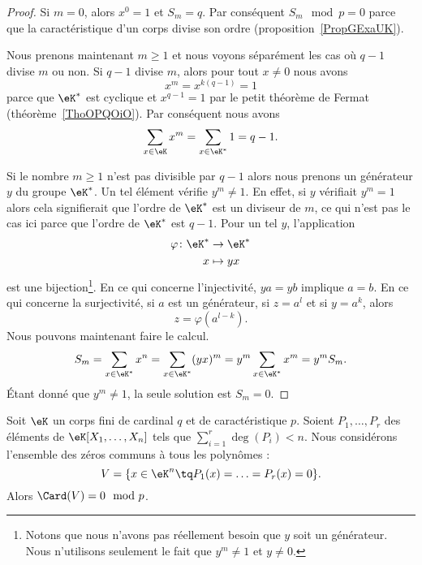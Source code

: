 \begin{proof}
	Si \( m=0\), alors \( x^0=1\) et \( S_m=q\). Par conséquent \( S_m\mod p=0\) parce que la caractéristique d'un corps divise son ordre (proposition~\ref{PropGExaUK}).

	Nous prenons maintenant \( m\geq 1\) et nous voyons séparément les cas où \( q-1\) divise \( m\) ou non. Si \( q-1\) divise \( m\), alors pour tout \( x\neq 0\) nous avons
	\begin{equation}
		x^m=x^{k(q-1)}=1
	\end{equation}
	parce que \( \eK^*\) est cyclique et \( x^{q-1}=1\) par le petit théorème de Fermat (théorème~\ref{ThoOPQOiO}). Par conséquent nous avons
	\begin{equation}
		\sum_{x\in \eK}x^m=\sum_{x\in \eK^*}1=q-1.
	\end{equation}

	Si le nombre \( m\geq 1\) n'est pas divisible par \( q-1\) alors nous prenons un générateur \( y\) du groupe \( \eK^*\). Un tel élément vérifie \( y^m\neq 1\). En effet, si \( y\) vérifiait \( y^m=1\) alors cela signifierait que l'ordre de \( \eK^*\) est un diviseur de \( m\), ce qui n'est pas le cas ici parce que l'ordre de \( \eK^*\) est \( q-1\). Pour un tel \( y\), l'application
	\begin{equation}
		\begin{aligned}
			\varphi\colon \eK^* & \to \eK^*  \\
			x                   & \mapsto yx
		\end{aligned}
	\end{equation}
	est une bijection\footnote{Notons que nous n'avons pas réellement besoin que \( y\) soit un générateur. Nous n'utilisons seulement le fait que \( y^m\neq 1\) et \( y\neq 0\).}. En ce qui concerne l'injectivité, \( ya=yb\) implique \( a=b\). En ce qui concerne la surjectivité, si \( a\) est un générateur, si \( z=a^l\) et si \( y=a^k\), alors
	\begin{equation}
		z=\varphi(a^{l-k}).
	\end{equation}
	Nous pouvons maintenant faire le calcul.
	\begin{equation}
		S_m=\sum_{x\in \eK^*}x^n=\sum_{x\in \eK^*}(yx)^m=y^m\sum_{x\in \eK^*}x^m=y^mS_m.
	\end{equation}
	Étant donné que \( y^m\neq 1\), la seule solution est \( S_m=0\).
\end{proof}

\begin{theorem}        \label{ThoLTcYKk}
	Soit \( \eK\) un corps fini de cardinal \( q\) et de caractéristique \( p\). Soient \( P_1,\ldots, P_r\) des éléments de \( \eK[X_1,\ldots, X_n]\) tels que \( \sum_{i=1}^r\deg(P_i)<n\). Nous considérons l'ensemble des zéros communs à tous les polynômes :
	\begin{equation}
		V=\{ x\in \eK^n\tq P_1(x)=\ldots=P_r(x)=0 \}.
	\end{equation}
	Alors \( \Card(V)=0\mod p\).
\end{theorem}

